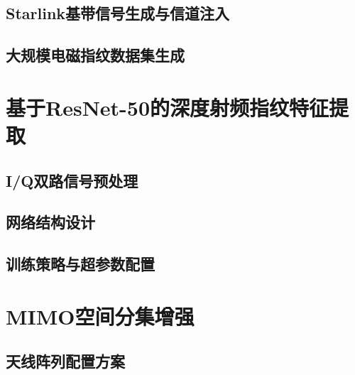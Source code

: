 \subsection{Starlink基带信号生成与信道注入}


\subsection{大规模电磁指纹数据集生成}


\section{基于ResNet-50的深度射频指纹特征提取}

\subsection{I/Q双路信号预处理}


\subsection{网络结构设计}


\subsection{训练策略与超参数配置}


\section{MIMO空间分集增强}

\subsection{天线阵列配置方案}

